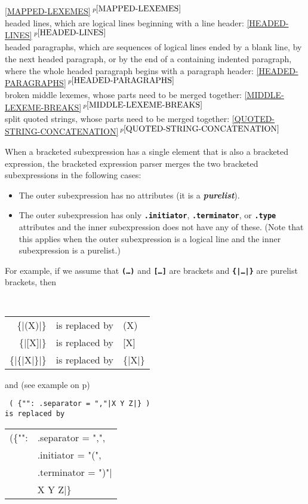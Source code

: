 \documentclass[12pt]{article}
\newcommand{\TT}[1]{{\tt \bfseries #1}}
\newcommand{\key}[1]{{\bf \em #1}\index{#1}}
\newcommand{\itemref}[1]{\ref{#1}$\,^{p\pageref{#1}}$}
\newcommand{\pagref}[1]{p\pageref{#1}}
\newenvironment{indpar}[1][0.3in]%
	{\begin{list}{}%
		     {\setlength{\itemsep}{0in}%
		      \setlength{\topsep}{0in}%
		      \setlength{\parsep}{1ex}%
		      \setlength{\labelwidth}{#1}%
		      \setlength{\leftmargin}{#1}%
		      \addtolength{\leftmargin}{\labelsep}}%
	 \item}%
	{\end{list}}
\begin{document}
\begin{indpar}[0.5in]
    \itemref{MAPPED-LEXEMES}
\\[0.5ex]
\hspace*{-0.2in}headed lines, which are logical lines beginning with
    a line header:
    \itemref{HEADED-LINES}
\\[0.5ex]
\hspace*{-0.2in}headed paragraphs,
    which are sequences of logical lines
    ended by a blank line, by the next headed paragraph,
    or by the end of a containing indented paragraph,
    where the whole headed paragraph begins with a paragraph
    header:
    \itemref{HEADED-PARAGRAPHS}
\\[0.5ex]
\hspace*{-0.2in}broken middle lexemes,
    whose parts need to be merged together:
    \itemref{MIDDLE-LEXEME-BREAKS}
\\[0.5ex]
\hspace*{-0.2in}split quoted strings,
    whose parts need to be merged together:
    \itemref{QUOTED-STRING-CONCATENATION}
\end{indpar}

When a bracketed subexpression has a single element that is also
a bracketed expression, the bracketed expression parser merges
the two bracketed subexpressions in the following cases:
\begin{itemize}
\item The outer subexpression has no attributes (it is a \key{purelist}).
\item The outer subexpression has only \TT{.initiator}, \TT{.terminator},
or \TT{.type} attributes and the inner subexpression does not have any
of these.  (Note that this applies when the outer subexpression is a
logical line and the inner subexpression is a purelist.)
\end{itemize}

For example, if we assume that \TT{(\ldots)} and \TT{[\ldots]} are brackets
and \TT{\{|\ldots|\}} are purelist brackets, then
\begin{center}\label{EXAMPLE-PURELIST-MERGE}
\tt
\begin{tabular}{rcl}
\{|(X)|\} & \rm is replaced by  & (X) \\
\{|[X]|\} & \rm is replaced by  & [X] \\
\{|\{|X|\}|\} & \rm is replaced by  & \{|X|\} \\
\end{tabular}
\end{center}
and (see example on \pagref{EXAMPLE-BRACKETABLE-MERGE})
\begin{center}
\tt
(~\{"":~.separator = ","|X Y Z|\}~) \\
{\rm is replaced by}  \\
\begin{tabular}{ll}
(\{"": & .separator = ",", \\
           & .initiator = "(", \\
           & .terminator = ")"| \\
           & X Y Z|\}
\end{tabular}
\end{center}
\end{document}
